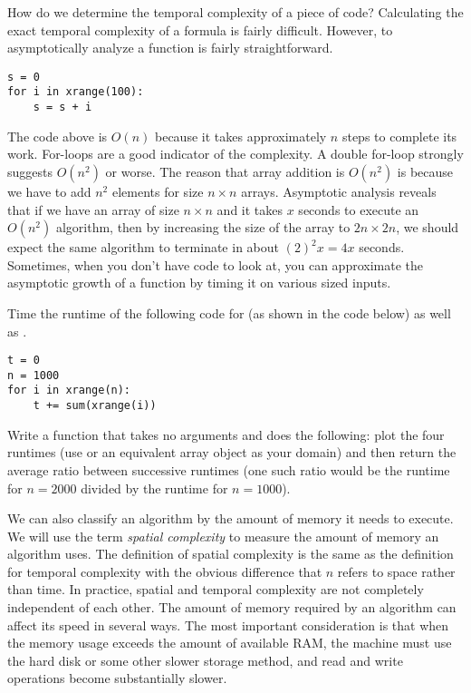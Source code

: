 How do we determine the temporal complexity of a piece of code?
Calculating the exact temporal complexity of a formula is fairly difficult.
However, to asymptotically analyze a function is fairly straightforward.
\begin{lstlisting}
s = 0
for i in xrange(100):
    s = s + i
\end{lstlisting}
The code above is $O(n)$ because it takes approximately $n$ steps to complete its work.
For-loops are a good indicator of the complexity.  A double for-loop strongly suggests
$O(n^2)$ or worse.  The reason that array addition is $O(n^2)$ is because we have to add
$n^2$ elements for size $n \times n$ arrays.  Asymptotic analysis reveals that
if we have an array of size $n \times n$ and it takes $x$ seconds to execute an $O(n^2)$ algorithm,
then by increasing the size of the array to $2n \times 2n$, we should expect the same algorithm
to terminate in about $(2)^2 x = 4x$ seconds.  Sometimes, when you don't have code to look at,
you can approximate the asymptotic growth of a function by timing it on various sized inputs.

\begin{problem}
Time the runtime of the following code for  (as shown in the code below) as well
as .
\begin{lstlisting}
t = 0
n = 1000
for i in xrange(n):
    t += sum(xrange(i))
\end{lstlisting}
Write a function that takes no arguments and does the following: plot the four runtimes
(use \li{[1000, 2000, 4000, 8000]} or an equivalent array object as your domain) and
then return the average ratio between successive runtimes (one such ratio would be
the runtime for $n = 2000$ divided by the runtime for $n = 1000$).
\end{problem}

We can also classify an algorithm by the amount of memory it needs to execute.  We will use the term \emph{spatial complexity} to measure the amount of memory an algorithm uses.  The definition of spatial complexity is the same as the definition for temporal complexity with the obvious difference that $n$ refers to space rather than time.
In practice, spatial and temporal complexity are not completely independent of each
other. The amount of memory required by an algorithm can affect its speed in several
ways. The most important consideration is that when the memory usage exceeds the amount
of available RAM, the machine must use the hard disk or some other slower storage
method, and read and write operations become substantially slower.

